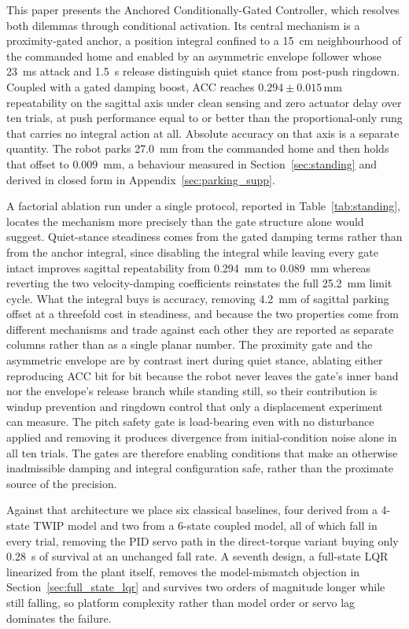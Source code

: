 \documentclass[a4paper,fleqn]{cas-dc}
\begin{document}
This paper presents the Anchored Conditionally-Gated Controller, which resolves
both dilemmas through conditional activation. Its central mechanism is a
proximity-gated anchor, a position integral confined to a \SI{15}{cm}
neighbourhood of the commanded home and enabled by an asymmetric envelope
follower whose \SI{23}{ms} attack and \SI{1.5}{s} release distinguish quiet
stance from post-push ringdown. Coupled with a gated damping boost, ACC reaches
$0.294{\pm}0.015$\,mm repeatability on the sagittal axis under clean sensing
and zero actuator delay over ten trials, at push performance equal to or better
than the proportional-only rung that carries no integral action at all.
Absolute accuracy on that axis is a separate quantity. The robot parks
\SI{27.0}{mm} from the commanded home and then holds that offset to
\SI{0.009}{mm}, a behaviour measured in Section~\ref{sec:standing} and derived
in closed form in Appendix~\ref{sec:parking_supp}.

A factorial ablation run under a single protocol, reported in
Table~\ref{tab:standing}, locates the mechanism more precisely than the gate
structure alone would suggest. Quiet-stance steadiness comes from the gated
damping terms rather than from the anchor integral, since disabling the integral
while leaving every gate intact improves sagittal repeatability from
\SI{0.294}{mm} to \SI{0.089}{mm} whereas reverting the two velocity-damping
coefficients reinstates the full \SI{25.2}{mm} limit cycle. What the integral
buys is accuracy, removing \SI{4.2}{mm} of sagittal parking offset at a threefold
cost in steadiness, and because the two properties come from different mechanisms
and trade against each other they are reported as separate columns rather than as
a single planar number. The proximity gate and the asymmetric envelope are by
contrast inert during quiet stance, ablating either reproducing ACC bit for bit
because the robot never leaves the gate's inner band nor the envelope's release
branch while standing still, so their contribution is windup prevention and
ringdown control that only a displacement experiment can measure. The pitch
safety gate is load-bearing even with no disturbance applied and removing it
produces divergence from initial-condition noise alone in all ten trials. The
gates are therefore enabling conditions that make an otherwise inadmissible
damping and integral configuration safe, rather than the proximate source of the
precision.

Against that architecture we place six classical baselines, four derived from a
4-state TWIP model and two from a 6-state coupled model, all of which fall in
every trial, removing the PID servo path in the direct-torque variant buying only
\SI{0.28}{s} of survival at an unchanged fall rate. A seventh design, a
full-state LQR linearized from the plant itself, removes the model-mismatch
objection in Section~\ref{sec:full_state_lqr} and survives two orders of
magnitude longer while still falling, so platform complexity rather than model
order or servo lag dominates the failure.
\end{document}
